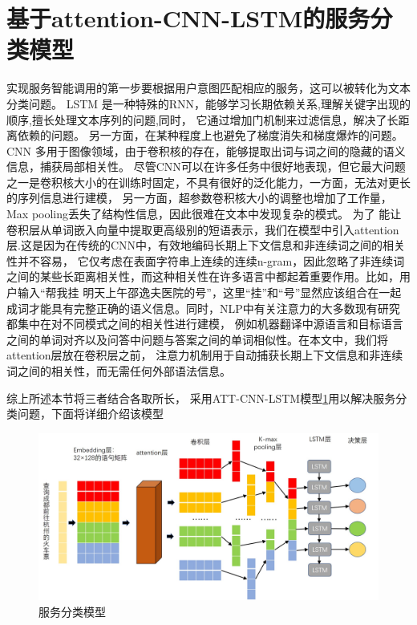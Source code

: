 \section{基于attention-CNN-LSTM的服务分类模型}
实现服务智能调用的第一步要根据用户意图匹配相应的服务，这可以被转化为文本分类问题。
LSTM
是一种特殊的RNN，能够学习长期依赖关系,理解关键字出现的顺序,擅长处理文本序列的问题,同时，
它通过增加门机制来过滤信息，解决了长距离依赖的问题。 另一方面，在某种程度上也避免了梯度消失和梯度爆炸的问题。
CNN
多用于图像领域，由于卷积核的存在，能够提取出词与词之间的隐藏的语义信息，捕获局部相关性。
尽管CNN可以在许多任务中很好地表现，但它最大问题之一是卷积核大小的在训练时固定，不具有很好的泛化能力，一方面，无法对更长的序列信息进行建模，
另一方面，超参数卷积核大小的调整也增加了工作量，Max pooling丢失了结构性信息，因此很难在文本中发现复杂的模式。
为了
能让卷积层从单词嵌入向量中提取更高级别的短语表示，我们在模型中引入attention层.这是因为在传统的CNN中，有效地编码长期上下文信息和非连续词之间的相关性并不容易，
它仅考虑在表面字符串上连续的连续n-gram，因此忽略了非连续词之间的某些长距离相关性，而这种相关性在许多语言中都起着重要作用。比如，用户输入“帮我挂
明天上午邵逸夫医院的号”，这里“挂”和“号”显然应该组合在一起成词才能具有完整正确的语义信息。同时，NLP中有关注意力的大多数现有研究都集中在对不同模式之间的相关性进行建模，
例如机器翻译中源语言和目标语言之间的单词对齐以及问答中问题与答案之间的单词相似性。在本文中，我们将attention层放在卷积层之前，
注意力机制用于自动捕获长期上下文信息和非连续词之间的相关性，而无需任何外部语法信息。

综上所述本节将三者结合各取所长， 采用ATT-CNN-LSTM模型\ref{fig:cnn-lstm}用以解决服务分类问题，下面将详细介绍该模型

\begin{figure}[htbp]
    \centering
    \includegraphics[scale=0.5]{./images/cnn-lstm.jpg}
    \caption{服务分类模型}
    \label{fig:cnn-lstm}
  \end{figure}


